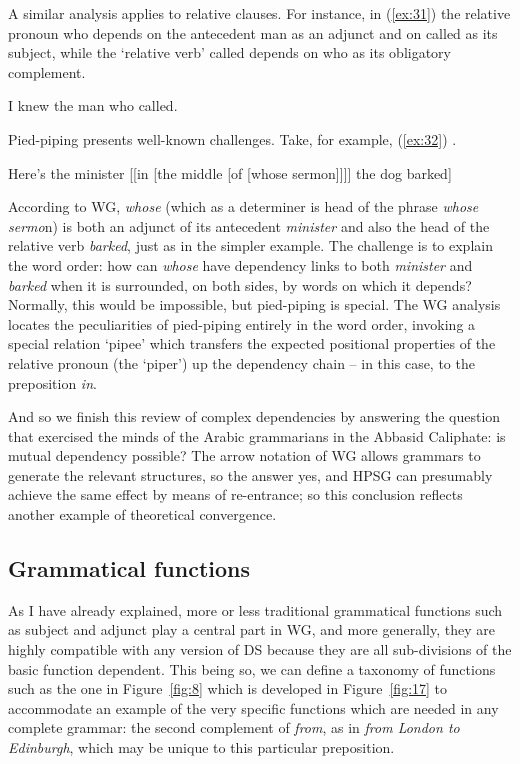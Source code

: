\documentclass[output=paper]{langscibook}
\begin{document}
A similar analysis applies to relative clauses. For instance, in (\ref{ex:31}) the relative pronoun who depends on the antecedent man as an adjunct and on called as its subject, while the ‘relative verb’ called depends on who as its obligatory complement.

\begin{exe}
	\ex \label{ex:31} I knew the man who called.
\end{exe}

Pied-piping presents well-known challenges. Take, for example, (\ref{ex:32}) \citep[212]{ps2}.

\begin{exe}
	\ex \label{ex:32} Here’s the minister [[in [the middle [of [whose sermon]]]] the dog barked]
\end{exe}

According to WG, \emph{whose} (which as a determiner is head of the phrase \emph{whose sermo}n) is both an adjunct of its antecedent \emph{minister} and also the head of the relative verb \emph{barked}, just as in the simpler example. The challenge is to explain the word order: how can \emph{whose} have dependency links to both \emph{minister} and \emph{barked} when it is surrounded, on both sides, by words on which it depends? Normally, this would be impossible, but pied-piping is special. The WG analysis \citep{Hudson2017a} locates the peculiarities of pied-piping entirely in the word order, invoking a special relation ‘pipee’ which transfers the expected positional properties of the relative pronoun (the ‘piper’) up the dependency chain – in this case, to the preposition \emph{in}.

And so we finish this review of complex dependencies by answering the question that exercised the minds of the Arabic grammarians in the Abbasid Ca\-liph\-ate: is mutual dependency possible? The arrow notation of WG allows grammars to generate the relevant structures, so the answer yes, and HPSG can presumably achieve the same effect by means of re-entrance; so this conclusion reflects another example of theoretical convergence.


\subsection{Grammatical functions}
\label{sec:5.3}

As I have already explained, more or less traditional grammatical functions such as subject and adjunct play a central part in WG, and more generally, they are highly compatible with any version of DS because they are all sub-divisions of the basic function dependent. This being so, we can define a taxonomy of functions such as the one in Figure~\ref{fig:8} which is developed in Figure~\ref{fig:17} to accommodate an example of the very specific functions which are needed in any complete grammar: the second complement of \emph{from}, as in \emph{from London to Edinburgh}, which may be unique to this particular preposition.
\end{document}
